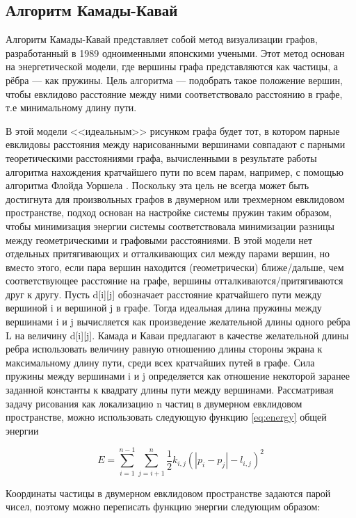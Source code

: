 \documentclass[14pt, russian]{scrartcl}
\begin{document}
\subsection{Алгоритм Камады-Кавай}

Алгоритм Камады-Кавай\cite{KK} представляет собой метод визуализации графов, разработанный в 1989 одноименными японскими учеными.
Этот метод основан на энергетической модели, где вершины графа представляются как частицы, а рёбра --- как пружины.
Цель алгоритма --- подобрать такое положение вершин, чтобы евклидово расстояние между ними соответствовало расстоянию в графе, т.е минимальному длину пути.

В этой модели <<идеальным>> рисунком графа будет тот, в котором парные евклидовы расстояния между нарисованными вершинами совпадают с парными теоретическими расстояниями графа, вычисленными в результате работы алгоритма нахождения кратчайшего пути по всем парам, например, с помощью алгоритма Флойда Уоршела \cite{FloydWarshall}.
Поскольку эта цель не всегда может быть достигнута для произвольных графов в двумерном или трехмерном евклидовом пространстве, подход основан на настройке системы пружин таким образом,
чтобы минимизация энергии системы соответствовала минимизации разницы между геометрическими и графовыми расстояниями. В этой модели нет отдельных притягивающих и отталкивающих сил между парами вершин, но вместо этого, если пара вершин находится (геометрически) ближе/дальше, чем соответствующее расстояние на графе, вершины отталкиваются/притягиваются друг к другу. Пусть d[i][j] обозначает расстояние кратчайшего пути между вершиной i и вершиной j в графе. Тогда идеальная длина пружины между вершинами i и j вычисляется как произведение желательной длины одного ребра L на величину d[i][j]. Камада и Каваи предлагают в качестве желательной длины ребра использовать величину равную отношению длины стороны экрана к максимальному длину пути, среди всех кратчайших путей в графе. Сила пружины между вершинами i и j определяется как отношение некоторой заранее заданной константы к квадрату длины пути между вершинами. Рассматривая задачу рисования как локализацию n частиц в двумерном евклидовом пространстве, можно использовать следующую функцию \ref{eq:energy} общей энергии

\begin{equation}\label{eq:energy}
	E = \sum_{i = 1}^{n - 1}\sum_{j = i + 1}^{n}{\frac{1}{2}k_{i, j}(|p_i - p_j| - l_{i, j})^2}
\end{equation}

Координаты частицы в двумерном евклидовом пространстве задаются парой чисел, поэтому можно переписать функцию энергии следующим образом:
\end{document}
